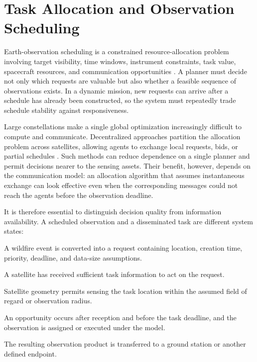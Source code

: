 \section{Task Allocation and Observation Scheduling}

Earth-observation scheduling is a constrained resource-allocation problem involving target visibility, time windows, instrument constraints, task value, spacecraft resources, and communication opportunities \citep{Ferrari2025}. A planner must decide not only which requests are valuable but also whether a feasible sequence of observations exists. In a dynamic mission, new requests can arrive after a schedule has already been constructed, so the system must repeatedly trade schedule stability against responsiveness.

Large constellations make a single global optimization increasingly difficult to compute and communicate. Decentralized approaches partition the allocation problem across satellites, allowing agents to exchange local requests, bids, or partial schedules \citep{Parjan2023,Zilberstein2025}. Such methods can reduce dependence on a single planner and permit decisions nearer to the sensing assets. Their benefit, however, depends on the communication model: an allocation algorithm that assumes instantaneous exchange can look effective even when the corresponding messages could not reach the agents before the observation deadline.

It is therefore essential to distinguish decision quality from information availability. A scheduled observation and a disseminated task are different system states:

\begin{description}[leftmargin=4.2cm,style=nextline]
\item[Task generation] A wildfire event is converted into a request containing location, creation time, priority, deadline, and data-size assumptions.
\item[Task reception] A satellite has received sufficient task information to act on the request.
\item[Observation opportunity] Satellite geometry permits sensing the task location within the assumed field of regard or observation radius.
\item[Observation fulfilment] An opportunity occurs after reception and before the task deadline, and the observation is assigned or executed under the model.
\item[Data delivery] The resulting observation product is transferred to a ground station or another defined endpoint.
\end{description}

